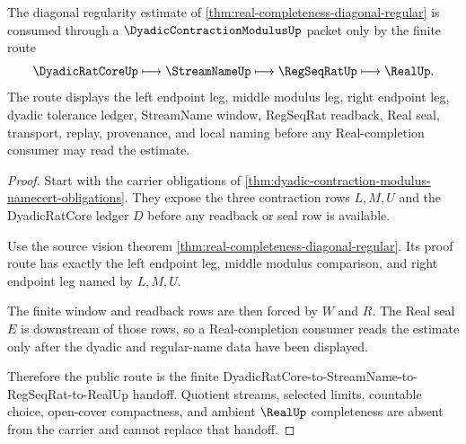 \begin{theorem}
\label{thm:dyadic-contraction-modulus-real-completeness-route}
The diagonal regularity estimate of \autoref{thm:real-completeness-diagonal-regular} is consumed through a $\DyadicContractionModulusUp$ packet only by the finite route
$$
\DyadicRatCoreUp\longmapsto\StreamNameUp\longmapsto\RegSeqRatUp\longmapsto\RealUp .
$$
The route displays the left endpoint leg, middle modulus leg, right endpoint leg, dyadic tolerance ledger, StreamName window, RegSeqRat readback, Real seal, transport, replay, provenance, and local naming before any Real-completion consumer may read the estimate.
\end{theorem}
\begin{proof}
Start with the carrier obligations of \autoref{thm:dyadic-contraction-modulus-namecert-obligations}. They expose the three contraction rows $L,M,U$ and the DyadicRatCore ledger $D$ before any readback or seal row is available.

Use the source vision theorem \autoref{thm:real-completeness-diagonal-regular}. Its proof route has exactly the left endpoint leg, middle modulus comparison, and right endpoint leg named by $L,M,U$.

The finite window and readback rows are then forced by $W$ and $R$. The Real seal $E$ is downstream of those rows, so a Real-completion consumer reads the estimate only after the dyadic and regular-name data have been displayed.

Therefore the public route is the finite DyadicRatCore-to-StreamName-to-RegSeqRat-to-RealUp handoff. Quotient streams, selected limits, countable choice, open-cover compactness, and ambient $\RealUp$ completeness are absent from the carrier and cannot replace that handoff.
\end{proof}


